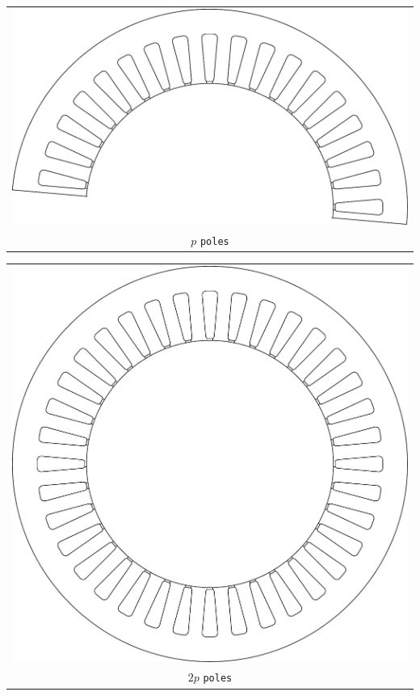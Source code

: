 \documentclass[a4paper,11pt,oneside,fleqn]{report}
\begin{document}
\begin{tabular}{c}
\includegraphics[scale=0.75]{../examples/stators/ppole} 
\\
$ p $ \texttt{poles}
\end{tabular}
\vspace{5mm}

\begin{tabular}{c}
\includegraphics[scale=0.75]{../examples/stators/2ppole}
 
\\
$ 2p $ \texttt{poles}
\end{tabular}
\end{document}

